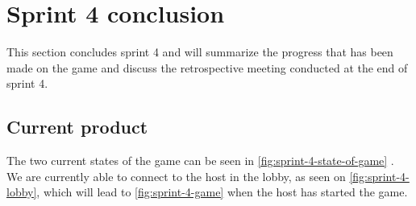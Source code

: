 \section{Sprint 4 conclusion}\label{sec:sprint4conclusion}
This section concludes sprint 4 and will summarize the progress that has been made on the game and discuss the retrospective meeting conducted at the end of sprint 4.

\subsection{Current product}
The two current states of the game can be seen in \autoref{fig:sprint-4-state-of-game} .
We are currently able to connect to the host in the lobby, as seen on \autoref{fig:sprint-4-lobby}, which will lead to \autoref{fig:sprint-4-game} when the host has started the game.
